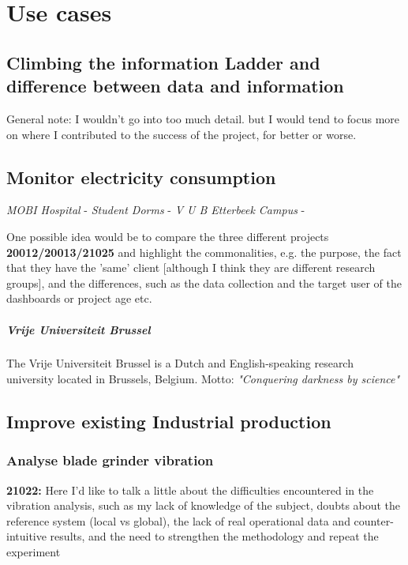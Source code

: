 \chapter{Use cases}

\section{Climbing the information Ladder and difference between data and information}
General note: I wouldn't go into too much detail. but I would tend to focus more on where I contributed to the success of the project, for better or worse.
\section{Monitor electricity consumption}
\textit{MOBI Hospital} -
\textit{Student Dorms} -
\textit{V U B Etterbeek Campus} -

One possible idea would be to compare the three different projects \textbf{20012/20013/21025} and highlight the commonalities, e.g. the purpose, the fact that they have the 'same' client [although I think they are different research groups], and the differences, such as the data collection and the target user of the dashboards or project age etc.

\paragraph{Vrije Universiteit Brussel}
The Vrije Universiteit Brussel is a Dutch and English-speaking research university located in Brussels, Belgium. Motto: \textit{"Conquering darkness by science"}

\section{Improve existing Industrial production}
\subsection{Analyse blade grinder vibration}
\textbf{21022:} Here I'd like to talk a little about the difficulties encountered in the vibration analysis, such as my lack of knowledge of the subject, doubts about the reference system (local vs global), the lack of real operational data and counter-intuitive results, and the need to strengthen the methodology and repeat the experiment \cite{Misc:stumabo_en_website}

% 
